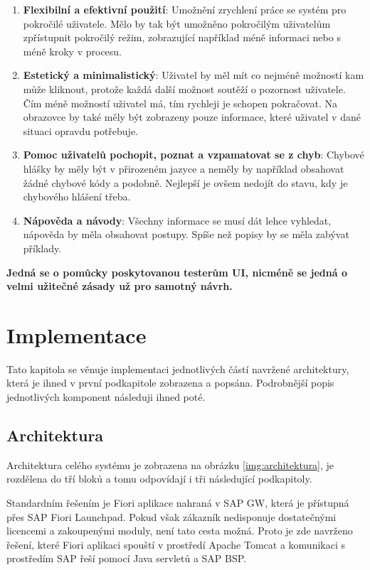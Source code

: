 \documentclass[thesis=M,czech]{FITthesis}[2012/06/26]
\begin{document}
\begin{enumerate}
	\item
	\textbf{Flexibilní a efektivní použití}: Umožnění zrychlení práce se systém pro pokročilé uživatele. Mělo by tak být umožněno pokročilým uživatelům zpřístupnit pokročilý režim, zobrazující například méně informaci nebo s méně kroky v procesu.
	\item
	\textbf{Estetický a minimalistický}: Uživatel by měl mít co nejméně možností kam může kliknout, protože každá další možnost soutěží o pozornost uživatele. Čím méně možností uživatel má,	tím rychleji je schopen pokračovat. Na obrazovce by také měly být zobrazeny pouze informace, které uživatel v dané situaci opravdu potřebuje.
	\item
	\textbf{Pomoc uživatelů pochopit, poznat a vzpamatovat se z chyb}: Chybové hlášky by měly být v přirozeném jazyce a neměly by například obsahovat žádné chybové kódy a podobně. Nejlepší je ovšem nedojít do stavu, kdy je chybového hlášení třeba.
	\item
	\textbf{Nápověda a návody}: Všechny informace se musí dát lehce vyhledat, nápověda by měla obsahovat postupy. Spíše než popisy by se měla zabývat příklady.
\end{enumerate} 

\textbf{Jedná se o pomůcky poskytovanou testerům UI, nicméně se jedná o velmi užitečné zásady už pro samotný návrh.}



\chapter{Implementace}
\label{chap:implementace}
Tato kapitola se věnuje implementaci jednotlivých částí navržené architektury, která je ihned v první podkapitole zobrazena a popsána. Podrobnější popis jednotlivých komponent následuji ihned poté. 

\section{Architektura}
Architektura celého systému je zobrazena na obrázku \ref{img:architektura}, je rozdělena do tří bloků a tomu odpovídají i tři následující podkapitoly. 

Standardním řešením je Fiori aplikace nahraná v SAP GW, která je přístupná přes SAP Fiori Launchpad. Pokud však zákazník nedisponuje dostatečnými licencemi a zakoupenými moduly, není tato cesta možná. Proto je zde navrženo řešení, které Fiori aplikaci spouští v prostředí Apache Tomcat a komunikaci s prostředím SAP řeší pomocí Java servletů a SAP BSP. 
\end{document}
